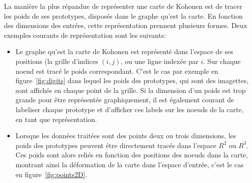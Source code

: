 La manière la plus répandue de représenter une carte de Kohonen est de tracer les poids de ses prototypes, disposés dans le graphe qu'est la carte. En fonction des dimensions des entrées, cette représentation prennent plusieurs formes. Deux exemples courants de représentation sont les suivants: 
\begin{itemize}
\item Le graphe qu'est la carte de Kohonen est représenté dans l'espace de ses positions (la grille d'indices $(i,j)$, ou une ligne indexée par $i$. Sur chaque noeud est tracé le poids correspondant. C'est le cas par exemple en figure~\ref{fig:digits} dans lequel les poids des prototypes, qui sont des imagettes, sont affichés en chaque point de la grille. Si la dimension d'un poids est trop grande pour être représentée graphiquement, il est également courant de labeliser chaque prototype et d'afficher ces labels sur les noeuds de la carte, en tant que représentation.
\item Lorsque les données traitées sont des points deux ou trois dimensions, les poids des prototypes peuvent être directement tracés dans l'espace $R^2$ ou $R^3$. Ces poids sont alors reliés en fonction des positions des noeuds dans la carte, montrant ainsi la déformation de la carte dans l'espace d'entrée, c'est le cas en figure~\ref{fig:points2D}.
\end{itemize}

